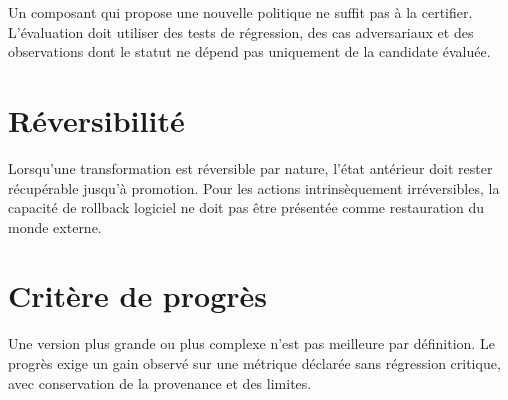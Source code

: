 Un composant qui propose une nouvelle politique ne suffit pas à la certifier. L'évaluation doit utiliser des tests de régression, des cas adversariaux et des observations dont le statut ne dépend pas uniquement de la candidate évaluée.

\section{Réversibilité}

Lorsqu'une transformation est réversible par nature, l'état antérieur doit rester récupérable jusqu'à promotion. Pour les actions intrinsèquement irréversibles, la capacité de rollback logiciel ne doit pas être présentée comme restauration du monde externe.

\section{Critère de progrès}

Une version plus grande ou plus complexe n'est pas meilleure par définition. Le progrès exige un gain observé sur une métrique déclarée sans régression critique, avec conservation de la provenance et des limites.